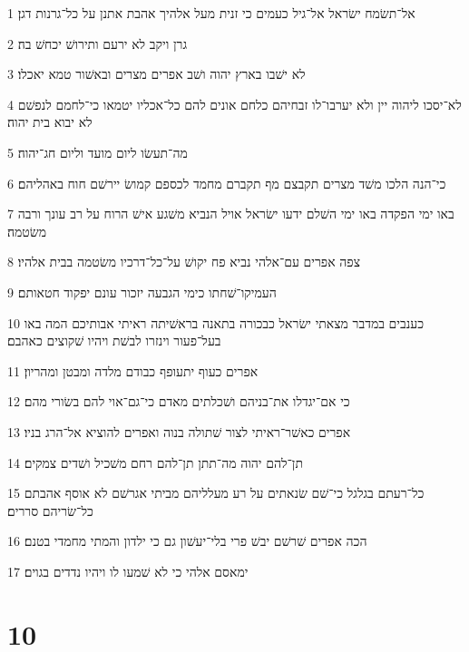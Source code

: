 \par 1 אל־תשׂמח ישׂראל אל־גיל כעמים כי זנית מעל אלהיך אהבת אתנן על כל־גרנות דגן׃
\par 2 גרן ויקב לא ירעם ותירושׁ יכחשׁ בה׃
\par 3 לא ישׁבו בארץ יהוה ושׁב אפרים מצרים ובאשׁור טמא יאכלו׃
\par 4 לא־יסכו ליהוה יין ולא יערבו־לו זבחיהם כלחם אונים להם כל־אכליו יטמאו כי־לחמם לנפשׁם לא יבוא בית יהוה׃
\par 5 מה־תעשׂו ליום מועד וליום חג־יהוה׃
\par 6 כי־הנה הלכו משׁד מצרים תקבצם מף תקברם מחמד לכספם קמושׂ יירשׁם חוח באהליהם׃
\par 7 באו ימי הפקדה באו ימי השׁלם ידעו ישׂראל אויל הנביא משׁגע אישׁ הרוח על רב עונך ורבה משׂטמה׃
\par 8 צפה אפרים עם־אלהי נביא פח יקושׁ על־כל־דרכיו משׂטמה בבית אלהיו׃
\par 9 העמיקו־שׁחתו כימי הגבעה יזכור עונם יפקוד חטאותם׃
\par 10 כענבים במדבר מצאתי ישׂראל כבכורה בתאנה בראשׁיתה ראיתי אבותיכם המה באו בעל־פעור וינזרו לבשׁת ויהיו שׁקוצים כאהבם׃
\par 11 אפרים כעוף יתעופף כבודם מלדה ומבטן ומהריון׃
\par 12 כי אם־יגדלו את־בניהם ושׁכלתים מאדם כי־גם־אוי להם בשׂורי מהם׃
\par 13 אפרים כאשׁר־ראיתי לצור שׁתולה בנוה ואפרים להוציא אל־הרג בניו׃
\par 14 תן־להם יהוה מה־תתן תן־להם רחם משׁכיל ושׁדים צמקים׃
\par 15 כל־רעתם בגלגל כי־שׁם שׂנאתים על רע מעלליהם מביתי אגרשׁם לא אוסף אהבתם כל־שׂריהם סררים׃
\par 16 הכה אפרים שׁרשׁם יבשׁ פרי בלי־יעשׁון גם כי ילדון והמתי מחמדי בטנם׃
\par 17 ימאסם אלהי כי לא שׁמעו לו ויהיו נדדים בגוים׃

\chapter{10}

